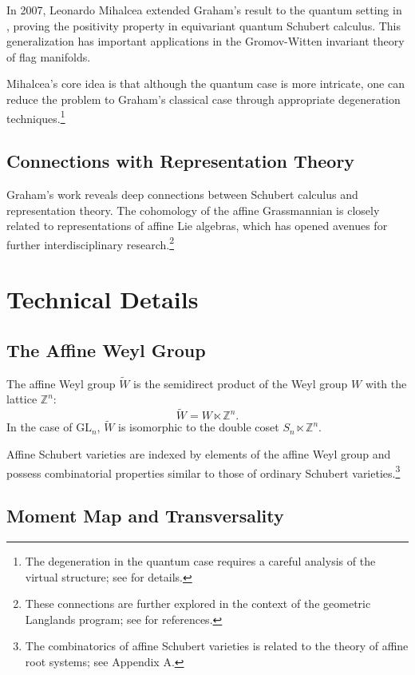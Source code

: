 In 2007, Leonardo Mihalcea extended Graham's result to the quantum setting in \cite{Mihalcea}, proving the positivity property in equivariant quantum Schubert calculus. This generalization has important applications in the Gromov-Witten invariant theory of flag manifolds.

Mihalcea's core idea is that although the quantum case is more intricate, one can reduce the problem to Graham's classical case through appropriate degeneration techniques.\footnote{The degeneration in the quantum case requires a careful analysis of the virtual structure; see \cite{Mihalcea} for details.}

\subsection{Connections with Representation Theory}

Graham's work reveals deep connections between Schubert calculus and representation theory. The cohomology of the affine Grassmannian is closely related to representations of affine Lie algebras, which has opened avenues for further interdisciplinary research.\footnote{These connections are further explored in the context of the geometric Langlands program; see \cite{Gr} for references.}

\section{Technical Details}

\subsection{The Affine Weyl Group}

The affine Weyl group $\widetilde{W}$ is the semidirect product of the Weyl group $W$ with the lattice $\mathbb{Z}^n$:
$$\widetilde{W} = W \ltimes \mathbb{Z}^n.$$
In the case of $\mathrm{GL}_n$, $\widetilde{W}$ is isomorphic to the double coset $S_n \ltimes \mathbb{Z}^n$.

Affine Schubert varieties are indexed by elements of the affine Weyl group and possess combinatorial properties similar to those of ordinary Schubert varieties.\footnote{The combinatorics of affine Schubert varieties is related to the theory of affine root systems; see \cite{Gr} Appendix A.}

\subsection{Moment Map and Transversality}

